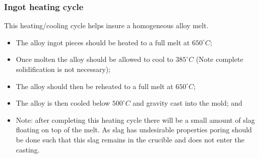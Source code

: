 \subsubsection{Ingot heating cycle}

This heating/cooling cycle helps insure a homogeneous alloy melt.
\begin{itemize}
\item The \MgZnCa alloy ingot pieces should be heated to a full melt at $650^{\circ}C$;
\item Once molten the alloy should be allowed to cool to $385^{\circ}C$ (Note complete solidification is not necessary);
\item The alloy should then be reheated to a full melt at $650^{\circ}C$;
\item The alloy is then cooled below $500^{\circ}C$ and gravity cast into the mold; and
\item Note: after completing this heating cycle there will be a small amount of slag floating on top of the melt. As slag has undesirable properties poring should be done such that this slag remains in the crucible and does not enter the casting.
\end{itemize}